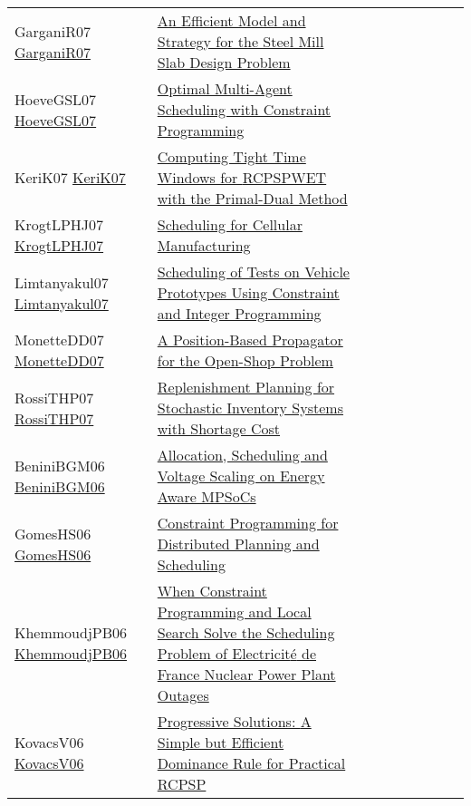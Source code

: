 {\begin{longtable}{p{3cm}p{7cm}lllllll}
GarganiR07 \href{https://doi.org/10.1007/978-3-540-74970-7\_8}{GarganiR07} &  \href{papers/GarganiR07.pdf}{An Efficient Model and Strategy for the Steel Mill Slab Design Problem} &  &  &  &  &  &  & \\
HoeveGSL07 \href{http://www.aaai.org/Library/AAAI/2007/aaai07-291.php}{HoeveGSL07} &  \href{papers/HoeveGSL07.pdf}{Optimal Multi-Agent Scheduling with Constraint Programming} &  &  &  &  &  &  & \\
KeriK07 \href{https://doi.org/10.1007/978-3-540-72397-4\_10}{KeriK07} &  \href{papers/KeriK07.pdf}{Computing Tight Time Windows for {RCPSPWET} with the Primal-Dual Method} &  &  &  &  &  &  & \\
KrogtLPHJ07 \href{https://doi.org/10.1007/978-3-540-74970-7\_10}{KrogtLPHJ07} &  \href{papers/KrogtLPHJ07.pdf}{Scheduling for Cellular Manufacturing} &  &  &  &  &  &  & \\
Limtanyakul07 \href{https://doi.org/10.1007/978-3-540-77903-2\_65}{Limtanyakul07} &  \href{papers/Limtanyakul07.pdf}{Scheduling of Tests on Vehicle Prototypes Using Constraint and Integer Programming} &  &  &  &  &  &  & \\
MonetteDD07 \href{https://doi.org/10.1007/978-3-540-72397-4\_14}{MonetteDD07} &  \href{papers/MonetteDD07.pdf}{A Position-Based Propagator for the Open-Shop Problem} &  &  &  &  &  &  & \\
RossiTHP07 \href{https://doi.org/10.1007/978-3-540-72397-4\_17}{RossiTHP07} &  \href{papers/RossiTHP07.pdf}{Replenishment Planning for Stochastic Inventory Systems with Shortage Cost} &  &  &  &  &  &  & \\
BeniniBGM06 \href{https://doi.org/10.1007/11757375\_6}{BeniniBGM06} &  \href{papers/BeniniBGM06.pdf}{Allocation, Scheduling and Voltage Scaling on Energy Aware MPSoCs} &  &  &  &  &  &  & \\
GomesHS06 \href{http://www.aaai.org/Library/Symposia/Spring/2006/ss06-04-024.php}{GomesHS06} &  \href{papers/GomesHS06.pdf}{Constraint Programming for Distributed Planning and Scheduling} &  &  &  &  &  &  & \\
KhemmoudjPB06 \href{https://doi.org/10.1007/11889205\_21}{KhemmoudjPB06} &  \href{papers/KhemmoudjPB06.pdf}{When Constraint Programming and Local Search Solve the Scheduling Problem of Electricit{\'{e}} de France Nuclear Power Plant Outages} &  &  &  &  &  &  & \\
KovacsV06 \href{https://doi.org/10.1007/11757375\_13}{KovacsV06} &  \href{papers/KovacsV06.pdf}{Progressive Solutions: {A} Simple but Efficient Dominance Rule for Practical {RCPSP}} &  &  &  &  &  &  & \\

\end{longtable}}
